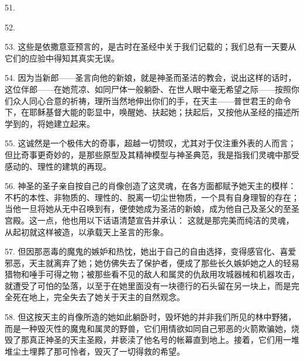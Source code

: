 51.  \par

52. \par

53. 这些是依撒意亚预言的，是古时在圣经中关于我们记载的；我们总有一天要从它们的应验中得知其真实无误。\par

54. 因为当新郎——圣言向他的新娘，就是神圣而圣洁的教会，说出这样的话时，这位伴郎——在她荒凉、如同尸体一般躺卧、在世人眼中毫无希望之际——按照你们众人同心合意的祈祷，理所当然地伸出你们的手，在天主——普世君王的命令下，在耶稣基督大能的彰显中，唤醒她、扶起她；扶起后，又按他从圣经的描述所学到的，将她建立起来。\par

55. 这诚然是一个极伟大的奇事，超越一切赞叹，尤其对于仅注重外表的人而言；但比奇事更奇妙的，是那些原型及其精神模型与神圣典范，我是指我们灵魂中那受感动的、理性的建筑的再现。\par

56. 神圣的圣子亲自按自己的肖像创造了这灵魂，在各方面都赋予她天主的模样：不朽的本性、非物质的、理性的、脱离一切尘世物质，一个具有自身理智的存在；当他一旦将她从无中召唤到有，便使她成为圣洁的新娘，成为他自己及圣父的至圣宫殿。这一点，他也用以下话语清楚宣告并承认： 这就是那完美而纯洁的灵魂，从起初就这样被造，以承载天上圣言的形象。\par

57. 但因那恶毒的魔鬼的嫉妒和热忱，她出于自己的自由选择，变得感官化、喜爱邪恶，天主就离弃了她；她仿佛失去了保护者，便成了那些长久嫉妒她之人的轻易猎物和唾手可得之物；被那些看不见的敌人和属灵的仇敌用攻城器械和机器攻击，就遭受了可怕的坠落，以至于在她里面没有一块德行的石头留在另一块上，而是完全死在地上，完全失去了她关于天主的自然观念。\par

58. 但这按天主的肖像所造的她如此躺卧时，毁坏她的并非我们所见的林中野猪，而是一种毁灭性的魔鬼和属灵的野兽，它们用情欲如同自己邪恶的火箭欺骗她，烧毁了那真正神圣的天主圣殿，并亵渎了他名号的帐幕直到地上。接着，它们用一堆堆尘土埋葬了那可怜者，毁灭了一切得救的希望。\par

